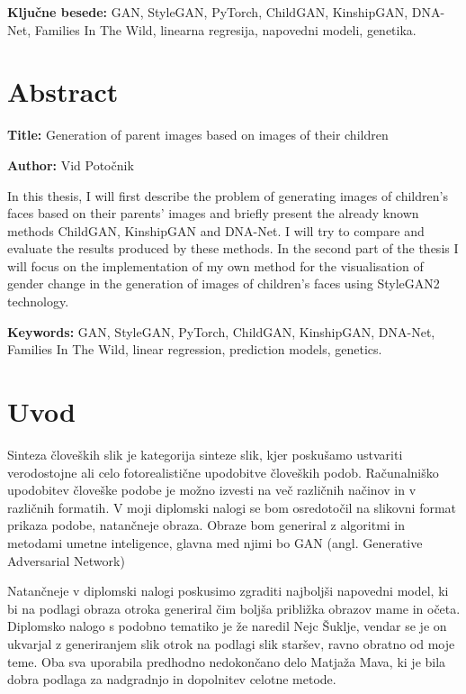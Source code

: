 \documentclass[a4paper,12pt,openright]{book}
\newcommand{\ttitleEn}{Generation of parent images based on images of their children}
\newcommand{\tauthor}{Vid Potočnik}
\newcommand{\tkeywords}{GAN, StyleGAN, PyTorch, ChildGAN, KinshipGAN, DNA-Net, Families In The Wild, linearna regresija, napovedni modeli, genetika}
\newcommand{\tkeywordsEn}{GAN, StyleGAN, PyTorch, ChildGAN, KinshipGAN, DNA-Net, Families In The Wild, linear regression, prediction models, genetics}
\newcommand{\clearemptydoublepage}{\newpage{\pagestyle{empty}\cleardoublepage}}
\begin{document}
\bigskip

\noindent\textbf{Ključne besede:} \tkeywords.
\clearemptydoublepage

\chapter*{Abstract}

\noindent\textbf{Title:} \ttitleEn
\bigskip

\noindent\textbf{Author:} \tauthor
\bigskip

\noindent In this thesis, I will first describe the problem of generating images of children's faces based on their parents' images and briefly present the already known methods ChildGAN, KinshipGAN and DNA-Net. I will try to compare and evaluate the results produced by these methods. 
In the second part of the thesis I will focus on the implementation of my own method for the visualisation of gender change in the generation of images of children's faces using StyleGAN2 technology.
\bigskip

\noindent\textbf{Keywords:} \tkeywordsEn.
\clearemptydoublepage

\mainmatter
\setcounter{page}{1}
\pagestyle{fancy}



\chapter{Uvod}


Sinteza človeških slik je kategorija sinteze slik, kjer poskušamo ustvariti verodostojne ali celo fotorealistične upodobitve človeških podob. Računalniško upodobitev človeške podobe je možno izvesti na več različnih načinov in v različnih formatih. V moji diplomski nalogi se bom osredotočil na slikovni format prikaza podobe, natančneje obraza. Obraze bom generiral z algoritmi in metodami umetne inteligence, glavna med njimi bo GAN (angl. Generative Adversarial Network)

Natančneje v diplomski nalogi poskusimo zgraditi najboljši napovedni model, ki bi na podlagi obraza otroka generiral čim boljša približka obrazov mame in očeta. Diplomsko nalogo s podobno tematiko je že naredil Nejc Šuklje, vendar se je on ukvarjal z generiranjem slik otrok na podlagi slik staršev, ravno obratno od moje teme. Oba sva uporabila predhodno nedokončano delo Matjaža Mava, ki je bila dobra podlaga za nadgradnjo in dopolnitev celotne metode. 
\end{document}
